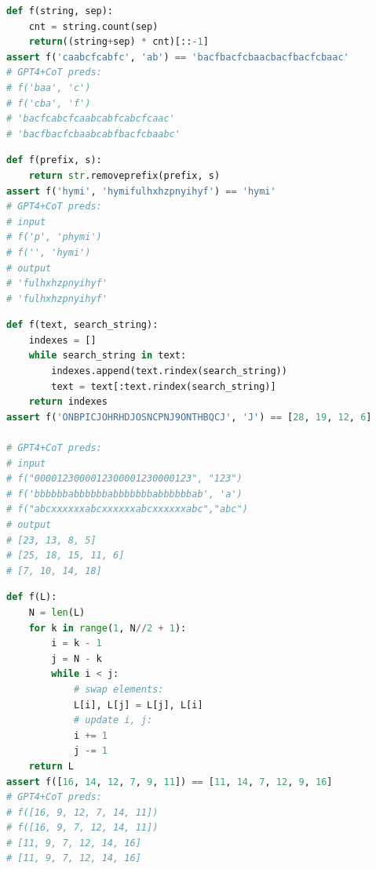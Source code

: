 \documentclass{article}
\begin{document}
\begin{minipage}{.48\textwidth} %
\begin{lstlisting}[caption=GPT-4 has the right idea but cannot do the string concatenation correctly,label={lst:gpt-4-simple1}, breaklines=true, language=python]
def f(string, sep):
    cnt = string.count(sep)
    return((string+sep) * cnt)[::-1]
assert f('caabcfcabfc', 'ab') == 'bacfbacfcbaacbacfbacfcbaac'
# GPT4+CoT preds:
# f('baa', 'c')
# f('cba', 'f')
# 'bacfcabcfcaabcabfcabcfcaac'
# 'bacfbacfcbaabcabfbacfcbaabc'
\end{lstlisting}
\end{minipage}\hfill
\begin{minipage}{.48\textwidth} %
\begin{lstlisting}[caption=GPT-4 might have been misled by the variable name prefix,label={lst:gpt-4-simple2}, breaklines=true, language=python]
def f(prefix, s):
    return str.removeprefix(prefix, s)
assert f('hymi', 'hymifulhxhzpnyihyf') == 'hymi'
# GPT4+CoT preds:
# input
# f('p', 'phymi')
# f('', 'hymi')
# output
# 'fulhxhzpnyihyf'
# 'fulhxhzpnyihyf'
\end{lstlisting}
\end{minipage}


\begin{minipage}{.48\textwidth} %
\begin{lstlisting}[caption={GPT-4 CoT failures where solutions requires counting to 30}, label={lst:gpt-4-hard1}, breaklines=true, language=python]
def f(text, search_string):
    indexes = []
    while search_string in text:
        indexes.append(text.rindex(search_string))
        text = text[:text.rindex(search_string)]
    return indexes
assert f('ONBPICJOHRHDJOSNCPNJ9ONTHBQCJ', 'J') == [28, 19, 12, 6]

# GPT4+CoT preds:
# input
# f("0000123000012300001230000123", "123")
# f('bbbbbbabbbbbbabbbbbbbabbbbbbab', 'a')
# f("abcxxxxxxabcxxxxxxabcxxxxxxabc","abc")
# output
# [23, 13, 8, 5]
# [25, 18, 15, 11, 6]
# [7, 10, 14, 18]
\end{lstlisting}
\end{minipage}\hfill %
\begin{minipage}{.48\textwidth}
\begin{lstlisting}[caption={GPT-4 CoT failure, cannot easily tell the answer without running the loops}, label={lst:gpt-4-hard2}, breaklines=true, language=python]
def f(L):
    N = len(L)
    for k in range(1, N//2 + 1):
        i = k - 1
        j = N - k
        while i < j:
            # swap elements:
            L[i], L[j] = L[j], L[i]
            # update i, j:
            i += 1
            j -= 1
    return L
assert f([16, 14, 12, 7, 9, 11]) == [11, 14, 7, 12, 9, 16]
# GPT4+CoT preds:
# f([16, 9, 12, 7, 14, 11])
# f([16, 9, 7, 12, 14, 11])
# [11, 9, 7, 12, 14, 16]
# [11, 9, 7, 12, 14, 16]
\end{lstlisting}
\end{minipage}
\end{document}
